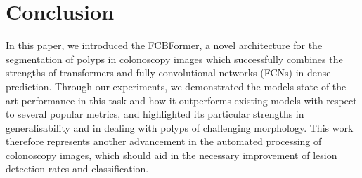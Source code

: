 \documentclass[runningheads]{llncs}
\begin{document}
\begin{table}[]
\caption{Results from the generalisability test in the ablation study. For ease of comparison, we include the results we obtained for FCBFormer in our generalisability tests.}\label{generalisability ablation}
\end{table}

\section{Conclusion}\label{sec:conclusion}
In this paper, we introduced the FCBFormer, a novel architecture for the segmentation of polyps in colonoscopy images which successfully combines the strengths of transformers and fully convolutional networks (FCNs) in dense prediction. Through our experiments, we demonstrated the models state-of-the-art performance in this task and how it outperforms existing models with respect to several popular metrics, and highlighted its particular strengths in generalisability and in dealing with polyps of challenging morphology. This work therefore represents another advancement in the automated processing of colonoscopy images, which should aid in the necessary improvement of lesion detection rates and classification.
\end{document}
